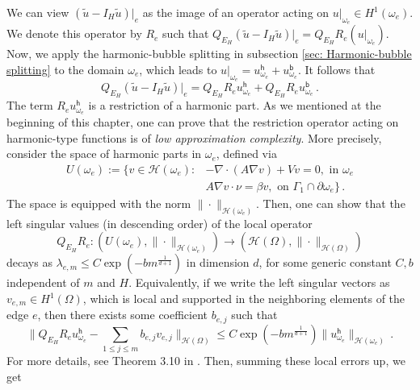 \documentclass[12pt]{caltech_thesis}
\numberwithin{equation}{section}
\begin{document}
We can view $(\tilde{u}-I_H\tilde{u})|_{e}$ as the image of an operator acting on $u|_{\omega_e} \in H^1(\omega_e)$. We denote this operator by $R_e$ such that $Q_{E_H}(\tilde{u}-I_H\tilde{u})|_{e} = Q_{E_H}R_e (u|_{\omega_e})$. Now, we apply the harmonic-bubble splitting in subsection \ref{sec: Harmonic-bubble splitting} to the domain $\omega_e$, which leads to $u|_{\omega_e} = u_{\omega_e}^\mathsf{h} + u_{\omega_e}^\mathsf{b}$. It follows that
\begin{equation}
    Q_{E_H}(\tilde{u}-I_H\tilde{u})|_{e} = Q_{E_H}R_e u^\mathsf{h}_{\omega_e} + Q_{E_H}R_e u^\mathsf{b}_{\omega_e}\, .
\end{equation}
The term $R_e u^\mathsf{h}_{\omega_e}$ is a restriction of a harmonic part. As we mentioned at the beginning of this chapter, one can prove that the restriction operator acting on harmonic-type functions is of \textit{low approximation complexity}. More precisely, consider the space of harmonic parts in $\omega_e$, defined via 
\begin{equation}
    \begin{aligned}
        U(\omega_e):= \{v \in \mathcal{H}(\omega_e): &-\nabla \cdot (A \nabla v)+Vv=0, \text{ in } \omega_e\\
        &A\nabla v\cdot\nu=\beta v, \text{ on } \Gamma_1 \cap \partial \omega_e\} 
        \, .
    \end{aligned}
    \end{equation}
The space is equipped with the norm $\|\cdot\|_{\mathcal{H}(\omega_e)}$. Then, one can show that the left singular values (in descending order) of the local operator 
\[Q_{E_H}R_e: (U(\omega_e),\|\cdot\|_{\mathcal{H}(\omega_e)}) \to (\mathcal{H}(\Omega), \|\cdot\|_{\mathcal{H}(\Omega)})\]
decays as $\lambda_{e,m} \leq C\exp(-bm^{\frac{1}{d+1}})$ in dimension $d$, for some generic constant $C,b$ independent of $m$ and $H$. Equivalently, if we write the left singular vectors as $v_{e,m} \in H^1(\Omega)$, which is local and supported in the neighboring elements of the edge $e$, then there exists some coefficient $b_{e,j}$ such that
\begin{equation}
    \|Q_{E_H}R_e u^\mathsf{h}_{\omega_e} - \sum_{1\leq j \leq m} b_{e,j} v_{e,j} \|_{\mathcal{H}(\Omega)} \leq C\exp(-bm^{\frac{1}{d+1}})\|u^\mathsf{h}_{\omega_e}\|_{\mathcal{H}(\omega_e)}\, .
\end{equation}
For more details, see Theorem 3.10 in \cite{chen2023exponentially}. Then, summing these local errors up, we get 
\end{document}
